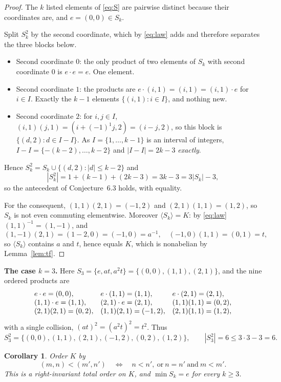\documentclass[11pt]{amsart}
\newtheorem{corollary}[theorem]{Corollary}
\theoremstyle{remark}
\begin{document}
\begin{proof}
The $k$ listed elements of \eqref{eq:S} are pairwise distinct because their
coordinates are, and $e=(0,0)\in S_{k}$.

Split $S_{k}^{2}$ by the second coordinate, which by \eqref{eq:law} adds and
therefore separates the three blocks below.
\begin{itemize}
\item Second coordinate $0$: the only product of two elements of $S_{k}$ with
      second coordinate $0$ is $e\cdot e=e$. One element.
\item Second coordinate $1$: the products are $e\cdot(i,1)=(i,1)=(i,1)\cdot e$ for
      $i\in I$. Exactly the $k-1$ elements $\{(i,1):i\in I\}$, and nothing new.
\item Second coordinate $2$: for $i,j\in I$,
      $(i,1)(j,1)=(i+(-1)^{1}j,2)=(i-j,2)$, so this block is
      $\{(d,2):d\in I-I\}$. As $I=\{1,\dots,k-1\}$ is an interval of integers,
      $I-I=\{-(k-2),\dots,k-2\}$ and $|I-I|=2k-3$ \emph{exactly}.
\end{itemize}
Hence $S_{k}^{2}=S_{k}\cup\{(d,2):|d|\le k-2\}$ and
\[
  |S_{k}^{2}|=1+(k-1)+(2k-3)=3k-3=3|S_{k}|-3,
\]
so the antecedent of Conjecture~6.3 holds, with equality.

For the consequent, $(1,1)(2,1)=(-1,2)$ and $(2,1)(1,1)=(1,2)$, so $S_{k}$ is not
even commuting elementwise. Moreover $\langle S_{k}\rangle=K$: by \eqref{eq:law}
$(1,1)^{-1}=(1,-1)$, and
\[
  (1,-1)(2,1)=(1-2,0)=(-1,0)=a^{-1},
  \quad
  (-1,0)(1,1)=(0,1)=t,
\]
so $\langle S_{k}\rangle$ contains $a$ and $t$, hence equals $K$, which is
nonabelian by Lemma~\ref{lem:tf}.
\end{proof}

\noindent
\textbf{The case $k=3$.} Here
$S_{3}=\{e,at,a^{2}t\}=\{(0,0),(1,1),(2,1)\}$, and the nine ordered products are
\[
\begin{array}{@{}l@{\quad}l@{\quad}l@{}}
 e\cdot e=(0,0), & e\cdot(1,1)=(1,1), & e\cdot(2,1)=(2,1),\\
 (1,1)\cdot e=(1,1), & (2,1)\cdot e=(2,1), & (1,1)(1,1)=(0,2),\\
 (2,1)(2,1)=(0,2), & (1,1)(2,1)=(-1,2), & (2,1)(1,1)=(1,2),
\end{array}
\]
with a single collision, $(at)^{2}=(a^{2}t)^{2}=t^{2}$. Thus
\[
  S_{3}^{2}=\{(0,0),(1,1),(2,1),(-1,2),(0,2),(1,2)\},
  \qquad
  |S_{3}^{2}|=6\le3\cdot3-3=6.
\]

\begin{corollary}\label{cor:ro}
Order $K$ by
\[
  (m,n)<(m',n')
  \quad\Longleftrightarrow\quad
  n<n',\ \text{or}\ n=n'\ \text{and}\ m<m'.
\]
This is a right-invariant total order on $K$, and $\min S_{k}=e$ for every $k\ge3$.
\end{corollary}
\end{document}
